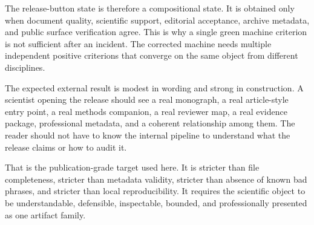 The release-button state is therefore a compositional state. It is obtained only when document quality, scientific support, editorial acceptance, archive metadata, and public surface verification agree. This is why a single green machine criterion is not sufficient after an incident. The corrected machine needs multiple independent positive criterions that converge on the same object from different disciplines.


The expected external result is modest in wording and strong in construction. A scientist opening the release should see a real monograph, a real article-style entry point, a real methods companion, a real reviewer map, a real evidence package, professional metadata, and a coherent relationship among them. The reader should not have to know the internal pipeline to understand what the release claims or how to audit it.


That is the publication-grade target used here. It is stricter than file completeness, stricter than metadata validity, stricter than absence of known bad phrases, and stricter than local reproducibility. It requires the scientific object to be understandable, defensible, inspectable, bounded, and professionally presented as one artifact family.
